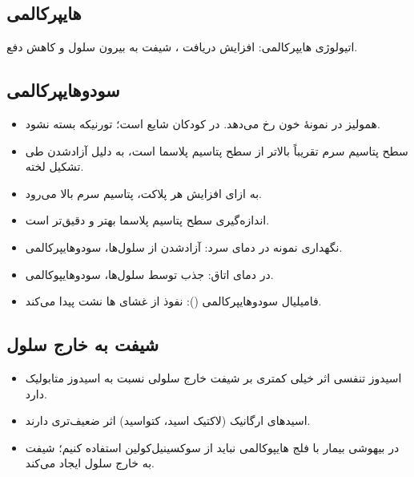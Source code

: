 \documentclass[11pt,a4paper]{article}
\begin{document}
\subsection*{هایپرکالمی}
اتیولوژی هایپرکالمی: افزایش دریافت ، شیفت به بیرون سلول و کاهش دفع.
\subsection*{سودوهایپرکالمی}
\begin{itemize}
\item همولیز در نمونهٔ خون رخ می‌دهد. در کودکان شایع است؛ تورنیکه بسته نشود.
\item سطح پتاسیم سرم تقریباً  بالاتر از سطح پتاسیم پلاسما است، به دلیل آزادشدن  طی تشکیل لخته.
\item به ازای افزایش هر  پلاکت، پتاسیم سرم  بالا می‌رود.
\item اندازه‌گیری سطح پتاسیم پلاسما بهتر و دقیق‌تر است.
\item نگهداری نمونه در دمای سرد: آزادشدن  از سلول‌ها، سودوهایپرکالمی.
\item در دمای اتاق: جذب  توسط سلول‌ها، سودوهایپوکالمی.
\item فامیلیال سودوهایپرکالمی (): نفوذ  از غشای ها نشت پیدا می‌کند.
\end{itemize}
\subsection*{شیفت به خارج سلول}
\begin{itemize}
\item اسیدوز تنفسی اثر خیلی کمتری بر شیفت خارج سلولی  نسبت به اسیدوز متابولیک دارد.
\item اسیدهای ارگانیک (لاکتیک اسید، کتواسید) اثر ضعیف‌تری دارند.
\item در بیهوشی بیمار با فلج هایپوکالمی نباید از سوکسینیل‌کولین استفاده کنیم؛ شیفت  به خارج سلول ایجاد می‌کند.
\end{itemize}
\end{document}
